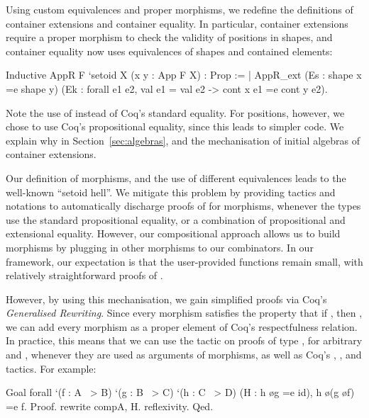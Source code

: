 \documentclass{llncs}
\begin{document}
Using custom equivalences and proper morphisms, we redefine the definitions of
container extensions and container equality. In particular, container
extensions require a proper morphism to check the validity of positions in
shapes, and container equality now uses equivalences of shapes and contained
elements: 
\begin{coqcode}
Inductive AppR F `{setoid X} (x y : App F X) : Prop :=
  | AppR_ext (Es : shape x =e shape y)
             (Ek : forall e1 e2, val e1 = val e2 -> cont x e1 =e cont y e2).
\end{coqcode}
Note the use of  instead of Coq's standard equality.  For positions,
however, we chose to use Coq's propositional equality, since this leads
to simpler code. We explain why in Section~\ref{sec:algebras}, and the
mechanisation of initial algebras of container extensions.

Our definition of morphisms, and the use of different equivalences leads to the
well-known ``setoid hell''. We mitigate this problem by providing tactics and
notations to automatically discharge proofs of  for morphisms,
whenever the types use the standard propositional equality, or a combination of
propositional and extensional equality. However, our compositional approach
allows us to build morphisms by plugging in other morphisms to our combinators.
In our framework, our expectation is that the user-provided functions remain
small, with relatively straightforward proofs of .

However, by using this mechanisation, we gain simplified proofs via
Coq's \emph{Generalised Rewriting}. Since every morphism 
satisfies the property that if , then , we can add
every morphism as a proper element of Coq's respectfulness relation. In
practice, this means that we can use the  tactic on proofs of
type , for arbitrary  and , whenever they are used as
arguments of morphisms, as well as Coq's , ,
and  tactics. For example:
\begin{coqcode}
Goal forall `(f : A ~> B) `(g : B ~> C) `(h : C ~> D) (H : h \o g =e id), 
  h \o (g \o f) =e f.
Proof.  rewrite compA, H.  reflexivity. Qed.
\end{coqcode}
\end{document}
